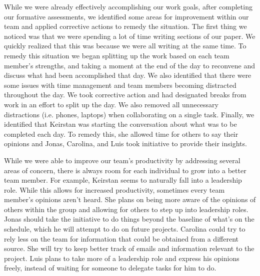 \par While we were already effectively accomplishing our work goals, after completing our formative assessments, we identified some areas for improvement within our team and applied corrective actions to remedy the situation. The first thing we noticed was that we were spending a lot of time writing sections of our paper. We quickly realized that this was because we were all writing at the same time. To remedy this situation we began splitting up the work based on each team member's strengths, and taking a moment at the end of the day to reconvene and discuss what had been accomplished that day. We also identified that there were some issues with time management and team members becoming distracted throughout the day. We took corrective action and had designated breaks from work in an effort to split up the day. We also removed all unnecessary distractions (i.e. phones, laptops) when collaborating on a single task. Finally, we identified that Keirstan was starting the conversation about what was to be completed each day. To remedy this, she allowed time for others to say their opinions and Jonas, Carolina, and Luis took initiative to provide their insights.
\par While we were able to improve our team's productivity by addressing several areas of concern, there is always room for each individual to grow into a better team member. For example, Keirstan seems to naturally fall into a leadership role. While this allows for increased productivity, sometimes every team member's opinions aren't heard. She plans on being more aware of the opinions of others within the group and allowing for others to step up into leadership roles. Jonas should take the initiative to do things beyond the baseline of what's on the schedule, which he will attempt to do on future projects. Carolina could try to rely less on the team for information that could be obtained from a different source. She will try to keep better track of emails and information relevant to the project. Luis plans to take more of a leadership role and express his opinions freely, instead of waiting for someone to delegate tasks for him to do.



